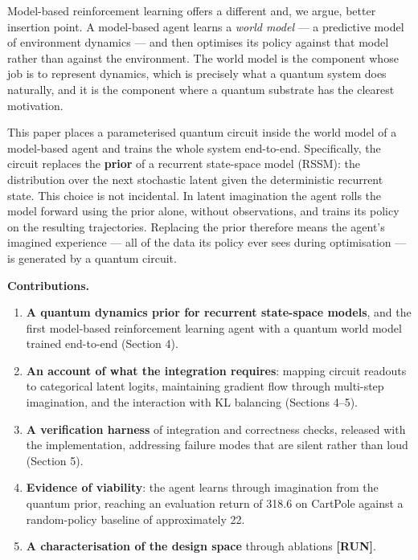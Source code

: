 \documentclass[
  11pt]{article}
\providecommand{\tightlist}{%
  \setlength{\itemsep}{0pt}\setlength{\parskip}{0pt}}
\begin{document}
Model-based reinforcement learning offers a different and, we argue,
better insertion point. A model-based agent learns a \emph{world model}
--- a predictive model of environment dynamics --- and then optimises
its policy against that model rather than against the environment. The
world model is the component whose job is to represent dynamics, which
is precisely what a quantum system does naturally, and it is the
component where a quantum substrate has the clearest motivation.

This paper places a parameterised quantum circuit inside the world model
of a model-based agent and trains the whole system end-to-end.
Specifically, the circuit replaces the \textbf{prior} of a recurrent
state-space model (RSSM): the distribution over the next stochastic
latent given the deterministic recurrent state. This choice is not
incidental. In latent imagination the agent rolls the model forward
using the prior alone, without observations, and trains its policy on
the resulting trajectories. Replacing the prior therefore means the
agent's imagined experience --- all of the data its policy ever sees
during optimisation --- is generated by a quantum circuit.

\textbf{Contributions.}

\begin{enumerate}
\def\labelenumi{\arabic{enumi}.}
\tightlist
\item
  \textbf{A quantum dynamics prior for recurrent state-space models},
  and the first model-based reinforcement learning agent with a quantum
  world model trained end-to-end (Section 4).
\item
  \textbf{An account of what the integration requires}: mapping circuit
  readouts to categorical latent logits, maintaining gradient flow
  through multi-step imagination, and the interaction with KL balancing
  (Sections 4--5).
\item
  \textbf{A verification harness} of integration and correctness checks,
  released with the implementation, addressing failure modes that are
  silent rather than loud (Section 5).
\item
  \textbf{Evidence of viability}: the agent learns through imagination
  from the quantum prior, reaching an evaluation return of 318.6 on
  CartPole against a random-policy baseline of approximately 22.
\item
  \textbf{A characterisation of the design space} through ablations
  \textbf{{[}RUN{]}}.
\end{enumerate}
\end{document}
